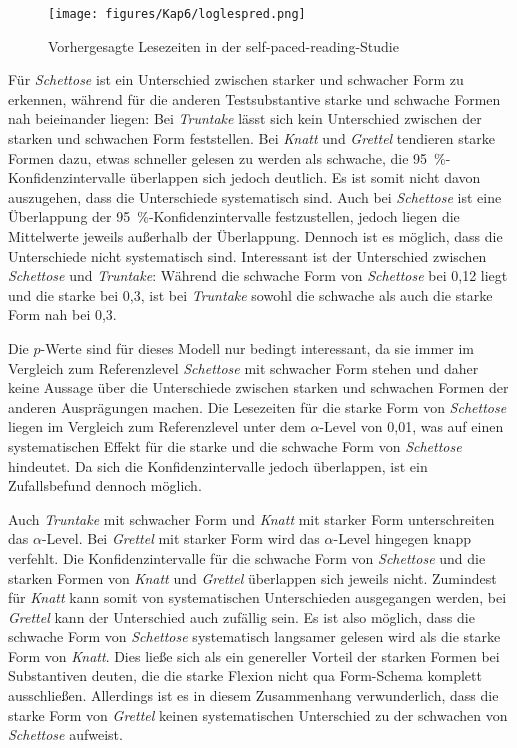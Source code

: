 \begin{figure}
\texttt{[image: figures/Kap6/loglespred.png]} 
\caption{Vorhergesagte Lesezeiten in der self-paced-reading-Studie}
\label{schemalespredrt}
\end{figure}

Für \textit{Schettose} ist ein Unterschied zwischen starker und schwacher Form zu erkennen, während für die anderen Testsubstantive starke und schwache Formen nah beieinander liegen: Bei \textit{Truntake} lässt sich kein Unterschied zwischen der starken und schwachen Form feststellen. Bei \textit{Knatt} und \textit{Grettel} tendieren starke Formen dazu, etwas schneller gelesen zu werden als schwache, die 95~\%-Konfidenzintervalle überlappen sich jedoch deutlich. Es ist somit nicht davon auszugehen, dass die Unterschiede systematisch sind. Auch bei \textit{Schettose} ist eine Überlappung der 95~\%-Konfidenzintervalle festzustellen, jedoch liegen die Mittelwerte jeweils außerhalb der Überlappung. Dennoch ist es möglich, dass die Unterschiede nicht systematisch sind. Interessant ist der Unterschied zwischen \textit{Schettose} und \textit{Truntake}: Während die schwache Form von \textit{Schettose} bei 0,12 liegt und die starke bei 0,3, ist bei \textit{Truntake} sowohl die schwache als auch die starke Form nah bei 0,3.   


Die $p$-Werte sind für dieses Modell nur bedingt interessant, da sie immer im Vergleich zum Referenzlevel \textit{Schettose} mit schwacher Form stehen und daher keine Aussage über die Unterschiede zwischen starken und schwachen Formen der anderen Ausprägungen machen. Die Lesezeiten für die starke Form von \textit{Schettose} liegen im Vergleich zum Referenzlevel unter dem $\alpha$-Level von 0,01, was auf einen sys\-te\-ma\-tisch\-en Effekt für die starke und die schwache Form von \textit{Schettose} hindeutet. Da sich die Konfidenzintervalle jedoch überlappen, ist ein Zufallsbefund dennoch möglich. 


Auch \textit{Truntake} mit schwacher Form und \textit{Knatt} mit starker Form unterschreiten das $\alpha$-Level. Bei \textit{Grettel} mit starker Form wird das $\alpha$-Level hingegen knapp verfehlt. Die Konfidenzintervalle für die schwache Form von \textit{Schettose} und die starken Formen von \textit{Knatt} und \textit{Grettel} überlappen sich jeweils nicht. Zumindest für \textit{Knatt} kann somit von systematischen Unterschieden ausgegangen werden, bei \textit{Grettel} kann der Unterschied auch zufällig sein. Es ist also möglich, dass die schwache Form von \textit{Schettose} systematisch langsamer gelesen wird als die starke Form von \textit{Knatt}. Dies ließe sich als ein genereller Vorteil der starken Formen bei Substantiven deuten, die die starke Flexion nicht qua Form-Schema komplett ausschließen. Allerdings ist es in diesem Zusammenhang verwunderlich, dass die starke Form von \textit{Grettel} keinen systematischen Unterschied zu der schwachen von \textit{Schettose} aufweist. 


